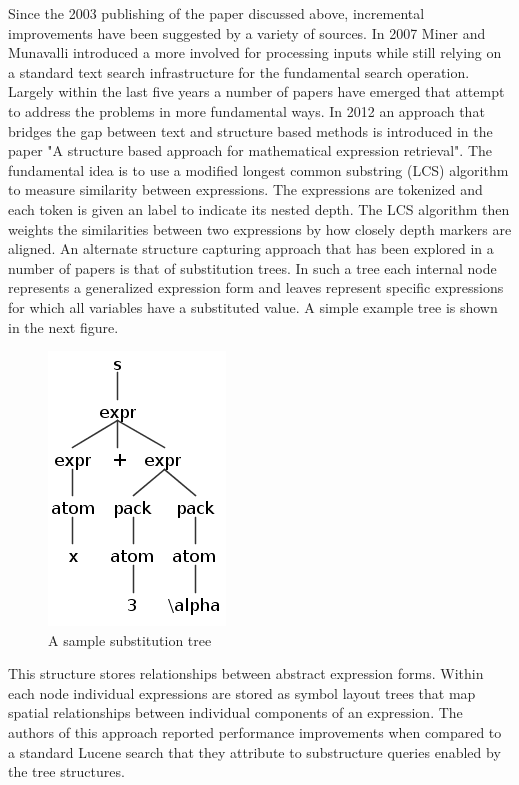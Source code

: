 \documentclass{sig-alternate}
\begin{document}
Since the 2003 publishing of the paper discussed above, incremental
improvements have been suggested by a variety of sources. In 2007 Miner
and Munavalli introduced a more involved for processing inputs while
still relying on a standard text search infrastructure for the 
fundamental search operation.\cite{miner:approach} Largely within the last five years a number of 
papers have emerged that attempt to address the problems in more
fundamental ways.
In 2012 an approach that bridges the gap between text and structure based
methods is introduced in the paper "A structure based
approach for mathematical expression retrieval".\cite{kumar:structure} The fundamental
idea is to use a modified longest common substring (LCS) algorithm to 
measure similarity between expressions. The expressions are tokenized
and each token is given an label to indicate its nested depth. The LCS
algorithm then weights the similarities between two expressions by how
closely depth markers are aligned. 
An alternate structure capturing approach that has been explored in
a number of papers is that of substitution trees.\cite{kolhase:mathwebsearch}\cite{yuan:layout} In such a tree each
internal node represents a generalized expression form and leaves
represent specific expressions for which all variables have a 
substituted value. A simple example tree is shown in the next figure.
\begin{figure}
	\centering
    \includegraphics[scale=0.75]{subtree}
	\caption{A sample substitution tree}
\end{figure}
This structure stores relationships between abstract expression forms.
Within each node individual expressions are stored as symbol layout trees
that map spatial relationships between individual components of an expression.
The authors of this approach reported performance improvements when compared
to a standard Lucene search that they attribute to substructure queries 
enabled by the tree structures. 
\end{document}
